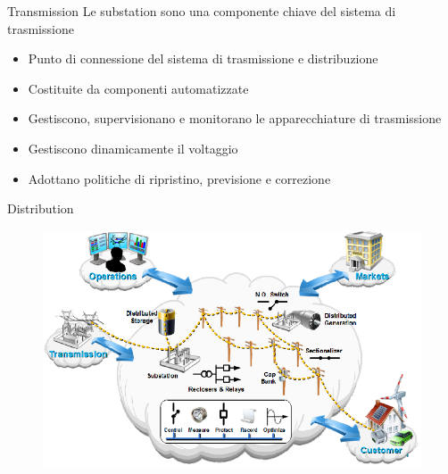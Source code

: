 \begin{frame}[fragile]{Transmission}
	Le substation sono una componente chiave del sistema di trasmissione
	\begin{itemize}[<+- | alert@+>]
		\item Punto di connessione del sistema di trasmissione e distribuzione
		\item Costituite da componenti automatizzate %
		\item Gestiscono, supervisionano e monitorano le apparecchiature di trasmissione %
		\item Gestiscono dinamicamente il voltaggio			
		\item Adottano politiche di ripristino, previsione e correzione   
	\end{itemize}
\end{frame}


\begin{frame}[fragile]{Distribution}
	\begin{figure}[h] 
		\includegraphics[scale=0.45]{imgs/distr.png}
	\end{figure}
\end{frame}
